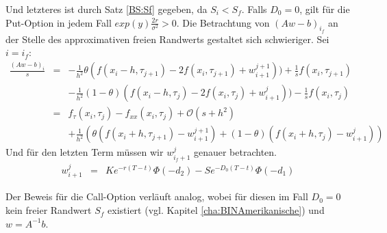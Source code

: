 Und letzteres ist durch Satz \ref{BS:Sf} gegeben, da $S_i<S_f$. Falls $D_0 = 0$, gilt für die Put-Option in jedem Fall $exp(y)\tfrac{2r}{\sigma^2}>0$. Die Betrachtung von $\left(Aw-b\right)_{i_f}$ an der Stelle des approximativen freien Randwerts gestaltet sich schwieriger. Sei $i = i_f$:
\begin{eqnarray*}
\frac{\left(Aw-b\right)_{i}}{s} & = & -\frac{1}{h^2}\theta (f(x_{i}-h,\tau _{j+1}) -2f(x_{i},\tau _{j+1}) + w^{j+1}_{i+1}))+ \frac{1}{s}f(x_{i},\tau _{j+1}) \\
                                  &   & -\frac{1}{h^2}(1-\theta)(f(x_{i}-h,\tau _{j}) -2f(x_{i},\tau _{j}) + w^{j}_{i+1})) - \frac{1}{s}f(x_{i},\tau _{j}) \\
                                  & = & f_{\tau}(x_i,\tau _{j})-f_{xx}(x_i,\tau _{j})+\mathcal{O}(s+h^2) \\
                                  &   & +\frac{1}{h^2}\left(\theta(f(x_{i}+h,\tau _{j+1}) - w^{j+1}_{i+1}) + (1-\theta)(f(x_{i}+h,\tau _j) - w^{j}_{i+1})\right)
\end{eqnarray*}
Und für den letzten Term müssen wir $w_{i_f+1}^j$ genauer betrachten.
\begin{eqnarray*}
w_{i+1}^j & = & Ke^{-r(T-t)}\Phi\left(-d_2\right) - Se^{-D_0(T-t)}\Phi\left(-d_1\right)
\end{eqnarray*}



Der Beweis für die Call-Option verläuft analog, wobei für diesen im Fall $D_0 = 0$ kein freier Randwert $S_f$ existiert (vgl. Kapitel \ref{cha:BINAmerikanische}) und $w = A^{-1}b$.